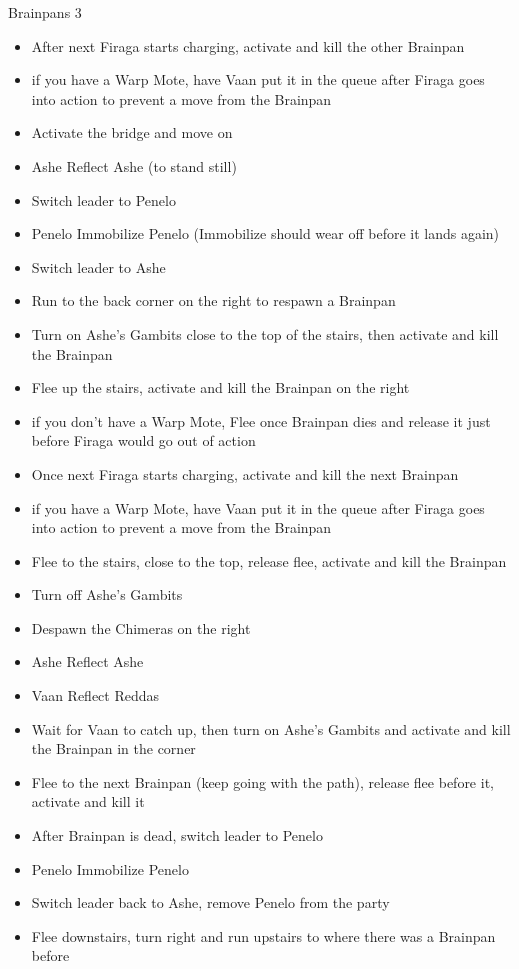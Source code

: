 \begin{battle}{Brainpans 3}
\begin{itemize}
	\item  After next Firaga starts charging, activate and kill the other Brainpan
		\item  if you have a Warp Mote, have Vaan put it in the queue after Firaga goes into action to prevent a move from the Brainpan
	\item  Activate the bridge and move on
	\item  Ashe Reflect Ashe (to stand still)
	\item  Switch leader to Penelo
	\item  Penelo Immobilize Penelo (Immobilize should wear off before it lands again)
	\item  Switch leader to Ashe
	\item  Run to the back corner on the right to respawn a Brainpan
	\item  Turn on Ashe's Gambits close to the top of the stairs, then activate and kill the Brainpan
	\item  Flee up the stairs, activate and kill the Brainpan on the right
		\item  if you don't have a Warp Mote, Flee once Brainpan dies and release it just before Firaga would go out of action
	\item  Once next Firaga starts charging, activate and kill the next Brainpan
		\item  if you have a Warp Mote, have Vaan put it in the queue after Firaga goes into action to prevent a move from the Brainpan
	\item  Flee to the stairs, close to the top, release flee, activate and kill the Brainpan
		\item  Turn off Ashe's Gambits
	\item  Despawn the Chimeras on the right
	\item  Ashe Reflect Ashe
	\item  Vaan Reflect Reddas
	\item  Wait for Vaan to catch up, then turn on Ashe's Gambits and activate and kill the Brainpan in the corner
	\item  Flee to the next Brainpan (keep going with the path), release flee before it, activate and kill it
	\item  After Brainpan is dead, switch leader to Penelo
	\item  Penelo Immobilize Penelo
	\item  Switch leader back to Ashe, remove Penelo from the party
	\item  Flee downstairs, turn right and run upstairs to where there was a Brainpan before

\end{itemize}
\end{battle}
